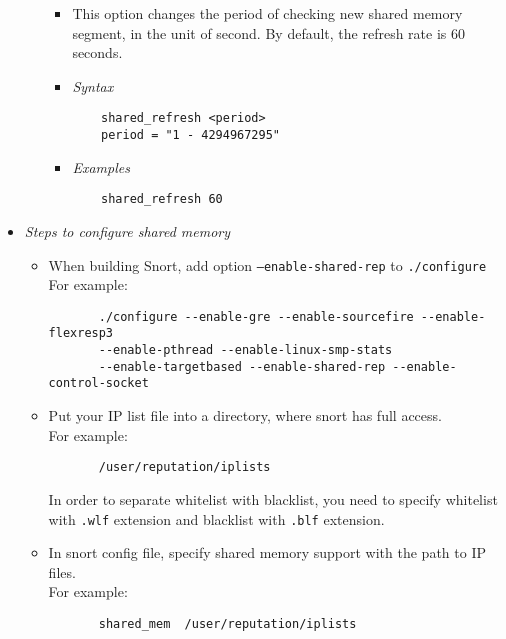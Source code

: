 \documentclass[english]{report}
\begin{document}
\begin{itemize}
\begin{itemize}
\begin{itemize}
  \item[]This option changes the period of checking new shared memory segment, in the unit of second.
  By default, the refresh rate is $60$ seconds.  
  
  \item[]\textit{Syntax}
   \begin{verbatim}    
    shared_refresh <period>
    period = "1 - 4294967295"
   \end{verbatim}  
  \item[]\textit{Examples}
   \begin{verbatim}            
    shared_refresh 60
   \end{verbatim}
\end{itemize}
\end{itemize} 

 \item[]\textit{Steps to configure shared memory}

\begin{itemize}
   
   \item When building Snort, add option \texttt{--enable-shared-rep} to \texttt{./configure}\\
         For example:
      \begin{verbatim}
       ./configure --enable-gre --enable-sourcefire --enable-flexresp3 
       --enable-pthread --enable-linux-smp-stats 
       --enable-targetbased --enable-shared-rep --enable-control-socket
      \end{verbatim}
   \item Put your IP list file into a directory, where snort has full access. \\
      For example: 

      \begin{verbatim}
       /user/reputation/iplists
      \end{verbatim}

      In order to separate whitelist with blacklist, you need to specify 
      whitelist with \texttt{.wlf} extension and blacklist with \texttt{.blf} extension.
   \item In snort config file, specify shared memory support with the path to IP files.\\
      For example: 

      \begin{verbatim}
       shared_mem  /user/reputation/iplists
      \end{verbatim}


\end{itemize}
\end{itemize}
\end{document}
